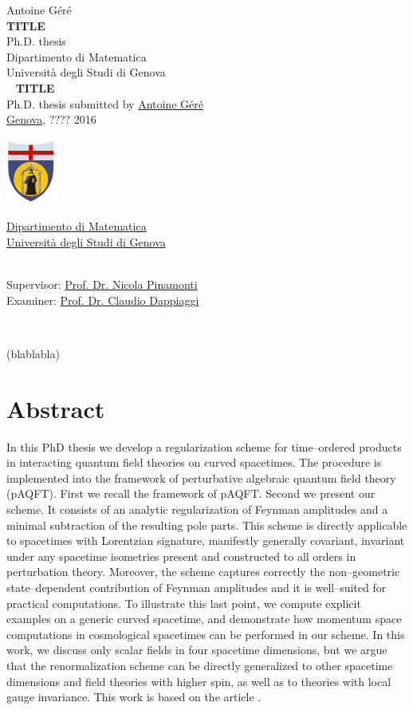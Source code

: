 \documentclass[11pt]{book}
\makeatletter
\newcommand*{\makepagetitle}{%
%
{\raggedright%
%
%
%
%
\thispagestyle{empty}%
%
\vspace*{50pt}
%
{\Large Antoine Géré}\\%
%
\vspace*{120pt}%
%
{\Huge\bfseries TITLE}\\[\baselineskip]%
%
\vspace*{60pt}%
%
{\Large Ph.D. thesis}\\[\baselineskip]%
%
\vspace*{80pt}%
%
{\Large Dipartimento di Matematica}\\[\baselineskip]%
%
\vspace*{1pt}
%
{\Large Università degli Studi di Genova}\\[\baselineskip]%
%
\vfill%
%
%
\newpage%
%
\thispagestyle{empty}%
%
\ \vfill%
%
%
\textbf{TITLE} \\[2pt] %
Ph.D. thesis submitted by \href{mailto:gere@dima.unige.it}{Antoine Géré} \\[1pt]
\href{http://www.comune.genova.it/}{Genova}, ???? %
2016 \\[10pt]
%
%
\begin{minipage}{0.1\linewidth}
\includegraphics[scale=1]{unige.pdf}
\end{minipage}
%
\begin{minipage}{0.85\linewidth}
\href{http://www.dima.unige.it/}{Dipartimento di Matematica} \\[1pt]
\href{http://www.unige.it/}{Università degli Studi di Genova}
\end{minipage}
%
%
\vspace*{10pt} \\
Supervisor: \href{mailto:pinamont@dima.unige.it}{Prof. Dr. Nicola Pinamonti} \\[1pt]
%
Examiner: \href{mailto:claudio.dappiaggi@unipv.it}{Prof. Dr. Claudio Dappiaggi}
%
%
%
%
}%
%
}%
\theoremstyle{break}
\makeatother
\begin{document}


\makepagetitle




\newpage
\ \vfill


\begin{flushright}
(blablabla)
\end{flushright}


\vfill


\newpage
\vspace*{100pt}
\section*{Abstract}


In this PhD thesis we develop a regularization scheme for time--ordered products in interacting quantum field theories on curved spacetimes. The procedure is implemented into the framework of perturbative algebraic quantum field theory (pAQFT). First we recall the framework of pAQFT. Second we present our scheme. It consists of an analytic regularization of Feynman amplitudes and a minimal subtraction of the resulting pole parts. This scheme is directly applicable to spacetimes with Lorentzian signature, manifestly generally covariant, invariant under any spacetime isometries present and constructed to all orders in perturbation theory. Moreover, the scheme captures correctly the non--geometric state--dependent contribution of Feynman amplitudes and it is well--suited for practical computations. To illustrate this last point, we compute explicit examples on a generic curved spacetime, and demonstrate how momentum space computations in cosmological spacetimes can be performed in our scheme. In this work, we discuss only scalar fields in four spacetime dimensions, but we argue that the renormalization scheme can be directly generalized to other spacetime dimensions and field theories with higher spin, as well as to theories with local gauge invariance. This work is based on the article \cite{GHP_2015}.


\tableofcontents
\end{document}
